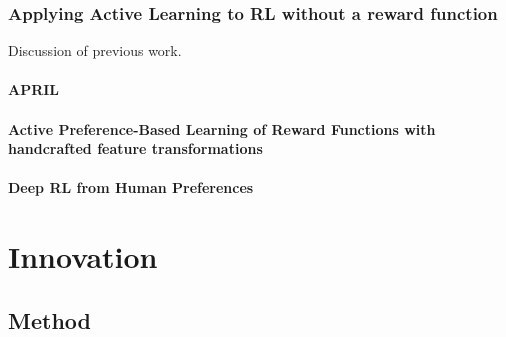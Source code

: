 \documentclass[11pt, a4paper, bibliography=totoc]{report}
\begin{document}
\section{Applying Active Learning to RL without a reward function}
Discussion of previous work.

\subsection{APRIL}

\subsection{Active Preference-Based Learning of Reward Functions with handcrafted feature transformations}

\subsection{Deep RL from Human Preferences}


\part{Innovation}

\chapter{Method}
\end{document}

